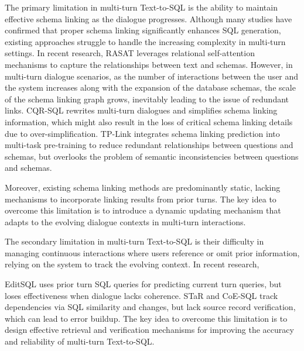 \documentclass[11pt]{article}
\begin{document}
The primary limitation in multi-turn Text-to-SQL is the ability to maintain effective schema linking as the dialogue progresses. Although many studies have confirmed that proper schema linking significantly enhances SQL generation, existing approaches struggle to handle the increasing complexity in multi-turn settings. 
In recent research, RASAT \cite{qi-etal-2022-rasat} leverages relational self-attention mechanisms to capture the relationships between text and schemas. However, in multi-turn dialogue scenarios, as the number of interactions between the user and the system increases along with the expansion of the database schemas, the scale of the schema linking graph grows, inevitably leading to the issue of redundant links. CQR-SQL \cite{xiao2022cqr} rewrites multi-turn dialogues and simplifies schema linking information, which might also result in the loss of critical schema linking details due to over-simplification. TP-Link \cite{liu-etal-2024-tp} integrates schema linking prediction into multi-task pre-training to reduce redundant relationships between questions and schemas, but overlooks the problem of semantic inconsistencies between questions and schemas. 

Moreover, existing schema linking methods are predominantly static, lacking mechanisms to incorporate linking results from prior turns. The key idea to overcome this limitation is to introduce a dynamic updating mechanism that adapts to the evolving dialogue contexts in multi-turn interactions.

The secondary limitation in multi-turn Text-to-SQL is their difficulty in managing continuous interactions where users reference or omit prior information, relying on the system to track the evolving context. In recent research, 

EditSQL \cite{zhang-etal-2019-editing} uses prior turn SQL queries for predicting current turn queries, but loses effectiveness when dialogue lacks coherence. 
STaR \cite{cai-etal-2022-star} and CoE-SQL \cite{zhang2024coesqlincontextlearningmultiturn} track dependencies via SQL similarity and changes, but lack source record verification, which can lead to error buildup. The key idea to overcome this limitation is to design effective retrieval and verification mechanisms for improving the accuracy and reliability of multi-turn Text-to-SQL.
\end{document}
